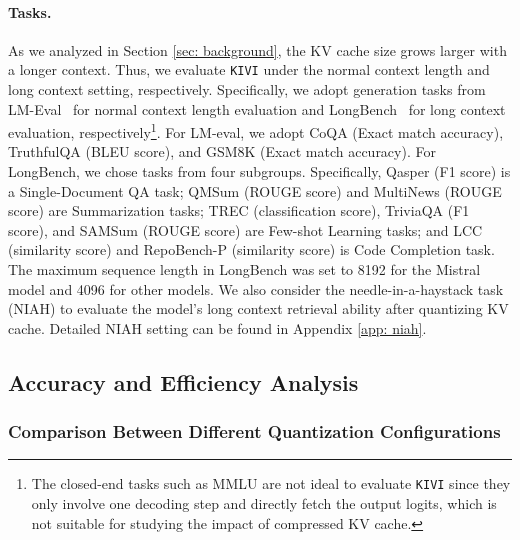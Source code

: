\paragraph{Tasks.}
As we analyzed in Section \ref{sec: background}, the KV cache size grows larger with a longer context. Thus, we evaluate \texttt{KIVI} under the normal context length and long context setting, respectively. Specifically, we adopt generation tasks from LM-Eval~\citep{eval-harness} for normal context length evaluation and LongBench~\citep{bai2023longbench} for long context evaluation, respectively\footnote{The closed-end tasks such as MMLU are not ideal to evaluate \texttt{KIVI} since they only involve one decoding step and directly fetch the output logits, which is not suitable for studying the impact of compressed KV cache.}. For LM-eval, we adopt CoQA (Exact match accuracy), TruthfulQA (BLEU score), and GSM8K (Exact match accuracy). For LongBench, we chose tasks from four subgroups. Specifically, Qasper (F1 score) is a Single-Document QA task; QMSum (ROUGE score) and MultiNews (ROUGE score) are Summarization tasks; TREC (classification score), TriviaQA (F1 score), and SAMSum (ROUGE score) are Few-shot Learning tasks; and LCC (similarity score) and RepoBench-P (similarity score) is Code Completion task. The maximum sequence length in LongBench was set to 8192 for the Mistral model and 4096 for other models. We also consider the needle-in-a-haystack task (NIAH) to evaluate the model's long context retrieval ability after quantizing KV cache. Detailed NIAH setting can be found in Appendix \ref{app: niah}.

\subsection{Accuracy and Efficiency Analysis}

\subsubsection{Comparison Between Different Quantization Configurations}


